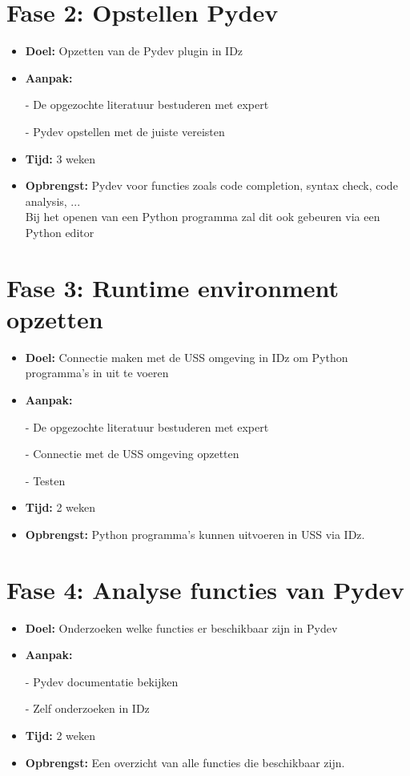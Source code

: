 \section{Fase 2: Opstellen Pydev}
\label{sec:m-opstellen-pydev}
\begin{itemize}
    \item \textbf{Doel:}
    Opzetten van de Pydev plugin in IDz
    \item \textbf{Aanpak:}
    \item[-] De opgezochte literatuur bestuderen met expert
    \item[-] Pydev opstellen met de juiste vereisten
    \item \textbf{Tijd:} 3 weken
    \item \textbf{Opbrengst:}
    Pydev voor functies zoals code completion, syntax check, code analysis, ... \\ 
    Bij het openen van een Python programma zal dit ook gebeuren via een Python editor
\end{itemize}


\section{Fase 3: Runtime environment opzetten}
\label{sec:m-python-interpreter-opzetten}
\begin{itemize}
    \item \textbf{Doel:}
    Connectie maken met de USS omgeving in IDz om Python programma's in uit te voeren
    \item \textbf{Aanpak:}
    \item[-] De opgezochte literatuur bestuderen met expert
    \item[-] Connectie met de USS omgeving opzetten
    \item[-] Testen
    
    \item \textbf{Tijd:} 2 weken
    \item \textbf{Opbrengst:}
    Python programma's kunnen uitvoeren in USS via IDz.
\end{itemize}


\section{Fase 4: Analyse functies van Pydev}
\label{sec:m-verdere-configuratie}
\begin{itemize}
    \item \textbf{Doel:}
    Onderzoeken welke functies er beschikbaar zijn in Pydev
    \item \textbf{Aanpak:}
    \item[-] Pydev documentatie bekijken
    \item[-] Zelf onderzoeken in IDz
    
    \item \textbf{Tijd:} 2 weken
    \item \textbf{Opbrengst:}
    Een overzicht van alle functies die beschikbaar zijn. 
\end{itemize}

